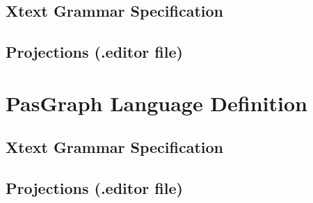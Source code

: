\subsection{Xtext Grammar Specification}


\subsection{Projections (.editor file)}\label{questionnaireLanguageDefEditor}



\section{PasGraph Language Definition}\label{pascalLanguageDef}

\subsection{Xtext Grammar Specification}


\subsection{Projections (.editor file)}\label{pascalLanguageDefEditor}











